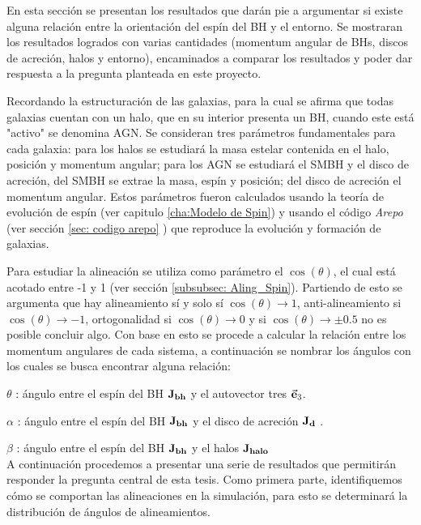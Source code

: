 En esta sección se presentan los resultados que darán pie a argumentar si existe alguna relación entre la orientación del espín del BH y el entorno. Se mostraran los resultados logrados con varias cantidades (momentum angular de BHs, discos de acreción, halos y entorno), encaminados a comparar los resultados y poder dar respuesta a la pregunta planteada en este proyecto. 

Recordando la estructuración de las galaxias, para la cual se afirma que todas galaxias cuentan con un halo, que en su interior presenta un BH, cuando este está "activo" se denomina AGN. Se consideran tres parámetros fundamentales para cada galaxia: para los halos se estudiará la masa estelar contenida en el halo, posición y momentum angular; para los AGN se estudiará el SMBH y el disco de acreción, del SMBH se extrae la masa, espín y posición; del disco de acreción el momentum angular. Estos parámetros fueron calculados usando la teoría de evolución de espín (ver capitulo \ref{cha:Modelo de Spin}) y usando el código {\it{Arepo}} (ver sección \ref{sec: codigo arepo} ) que reproduce la evolución y formación de galaxias. 

Para estudiar la alineación se utiliza como parámetro el $\cos (\theta)$, el cual está acotado entre -1 y 1 (ver sección \ref{subsubsec: Aling_Spin}). Partiendo de esto se argumenta que hay alineamiento sí y solo sí  $\cos (\theta) \to 1$, anti-alineamiento si $\cos (\theta)\to -1$, ortogonalidad si $\cos (\theta)\to 0$ y si $\cos (\theta)\to \pm 0.5 $ no es posible concluir algo. Con base en esto se procede a calcular la relación entre los momentum angulares de cada sistema, a continuación se nombrar los ángulos con los cuales se busca encontrar alguna relación:

$\theta$ : ángulo entre el espín del BH ${\bf{J_{bh}}}$ y el autovector tres $\vec{\bf{e}}_{3}$.

$\alpha$ : ángulo entre el espín del BH ${\bf{J_{bh}}}$  y el disco de acreción ${\bf{J_{d}}}$ .

$\beta$ :  ángulo entre el espín del BH ${\bf{J_{bh}}}$ y el halos ${\bf{J_{halo}}}$\\

A continuación procedemos a presentar una serie de resultados que permitirán responder la pregunta central de esta tesis.
Como primera parte, identifiquemos cómo se comportan las alineaciones en la simulación, para esto se determinará la distribución de ángulos de alineamientos. 

